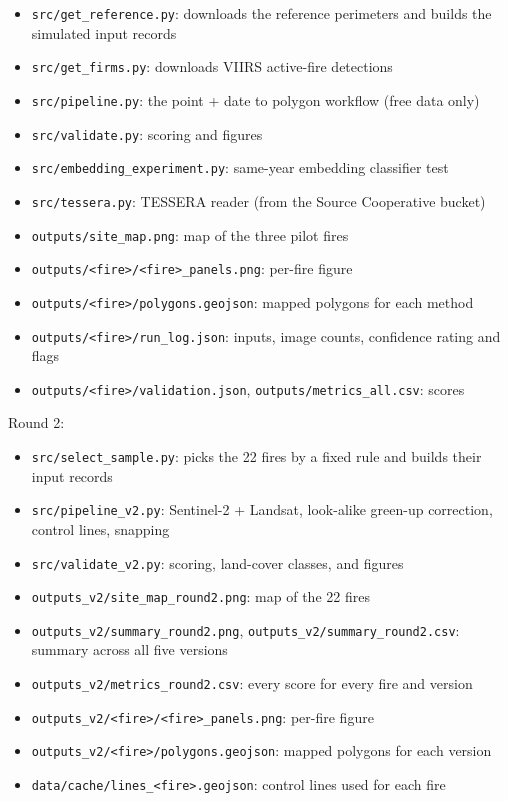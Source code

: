 \documentclass[
]{article}
\providecommand{\tightlist}{%
  \setlength{\itemsep}{0pt}\setlength{\parskip}{0pt}}
\begin{document}
\begin{itemize}
\tightlist
\item
  \texttt{src/get\_reference.py}: downloads the reference perimeters and
  builds the simulated input records
\item
  \texttt{src/get\_firms.py}: downloads VIIRS active-fire detections
\item
  \texttt{src/pipeline.py}: the point + date to polygon workflow (free
  data only)
\item
  \texttt{src/validate.py}: scoring and figures
\item
  \texttt{src/embedding\_experiment.py}: same-year embedding classifier
  test
\item
  \texttt{src/tessera.py}: TESSERA reader (from the Source Cooperative
  bucket)
\item
  \texttt{outputs/site\_map.png}: map of the three pilot fires
\item
  \texttt{outputs/\textless{}fire\textgreater{}/\textless{}fire\textgreater{}\_panels.png}:
  per-fire figure
\item
  \texttt{outputs/\textless{}fire\textgreater{}/polygons.geojson}:
  mapped polygons for each method
\item
  \texttt{outputs/\textless{}fire\textgreater{}/run\_log.json}: inputs,
  image counts, confidence rating and flags
\item
  \texttt{outputs/\textless{}fire\textgreater{}/validation.json},
  \texttt{outputs/metrics\_all.csv}: scores
\end{itemize}

Round 2:

\begin{itemize}
\tightlist
\item
  \texttt{src/select\_sample.py}: picks the 22 fires by a fixed rule and
  builds their input records
\item
  \texttt{src/pipeline\_v2.py}: Sentinel-2 + Landsat, look-alike
  green-up correction, control lines, snapping
\item
  \texttt{src/validate\_v2.py}: scoring, land-cover classes, and figures
\item
  \texttt{outputs\_v2/site\_map\_round2.png}: map of the 22 fires
\item
  \texttt{outputs\_v2/summary\_round2.png},
  \texttt{outputs\_v2/summary\_round2.csv}: summary across all five
  versions
\item
  \texttt{outputs\_v2/metrics\_round2.csv}: every score for every fire
  and version
\item
  \texttt{outputs\_v2/\textless{}fire\textgreater{}/\textless{}fire\textgreater{}\_panels.png}:
  per-fire figure
\item
  \texttt{outputs\_v2/\textless{}fire\textgreater{}/polygons.geojson}:
  mapped polygons for each version
\item
  \texttt{data/cache/lines\_\textless{}fire\textgreater{}.geojson}:
  control lines used for each fire
\end{itemize}
\end{document}
